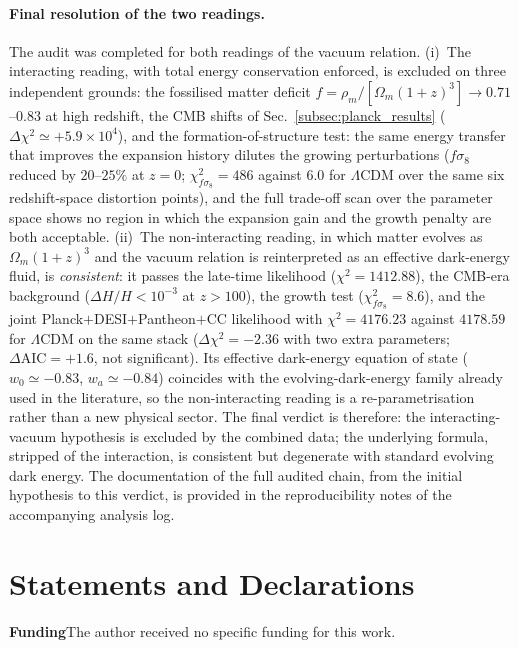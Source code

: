 \documentclass[pdflatex,sn-mathphys-num]{sn-jnl}%
\begin{document}
\paragraph*{Final resolution of the two readings.}\quad The audit was
completed for both readings of the vacuum relation. (i)~The interacting
reading, with total energy conservation enforced, is excluded on three
independent grounds: the fossilised matter deficit
$f=\rho_m/[\Omega_m(1+z)^3]\to0.71$--$0.83$ at high redshift, the CMB
shifts of Sec.~\ref{subsec:planck_results} ($\Delta\chi^2\simeq+5.9\times10^4$),
and the formation-of-structure test: the same energy transfer that improves
the expansion history dilutes the growing perturbations
($f\sigma_8$ reduced by $20$--$25\%$ at $z=0$; $\chi^2_{f\sigma_8}=486$
against $6.0$ for $\Lambda$CDM over the same six redshift-space
distortion points), and the full trade-off scan over the parameter space
shows no region in which the expansion gain and the growth penalty are
both acceptable. (ii)~The non-interacting reading, in which matter
evolves as $\Omega_m(1+z)^3$ and the vacuum relation is reinterpreted as
an effective dark-energy fluid, is \emph{consistent}: it passes the
late-time likelihood ($\chi^2=1412.88$), the CMB-era background
($\Delta H/H<10^{-3}$ at $z>100$), the growth test
($\chi^2_{f\sigma_8}=8.6$), and the joint
Planck$+$DESI$+$Pantheon$+$CC likelihood with
$\chi^2=4176.23$ against $4178.59$ for $\Lambda$CDM on the same stack
($\Delta\chi^2=-2.36$ with two extra parameters; $\Delta\mathrm{AIC}=+1.6$,
not significant). Its effective dark-energy equation of state
($w_0\simeq-0.83$, $w_a\simeq-0.84$) coincides with the
evolving-dark-energy family already used in the literature, so the
non-interacting reading is a re-parametrisation rather than a new
physical sector. The final verdict is therefore: the interacting-vacuum
hypothesis is excluded by the combined data; the underlying formula,
stripped of the interaction, is consistent but degenerate with standard
evolving dark energy. The documentation of the full audited chain, from
the initial hypothesis to this verdict, is provided in the
reproducibility notes of the accompanying analysis log.

\section*{Statements and Declarations}
\textbf{Funding}\quad The author received no specific funding for this work.
\end{document}
